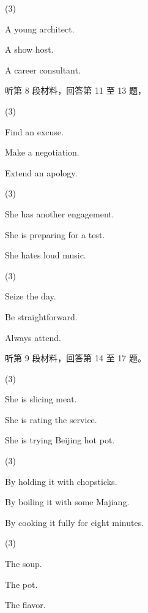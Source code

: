 \documentclass{英语试卷}
\begin{document}
\begin{choices}(3)
  \item A young architect.
  \item A show host.
  \item A career consultant.
\end{choices}
\par 听第 8 段材料，回答第 11 至 13 题，\par
{}
\begin{choices}(3)
  \item Find an excuse.
  \item Make a negotiation.
  \item Extend an apology.
\end{choices}
\begin{choices}(3)
  \item She has another engagement.
  \item She is preparing for a test.
  \item She hates loud music.
\end{choices}
\begin{choices}(3)
  \item Seize the day.
  \item Be straightforward.
  \item Always attend.
\end{choices}
\par 听第 9 段材料，回答第 14 至 17 题。\par
{}
\begin{choices}(3)
  \item She is slicing meat.
  \item She is rating the service.
  \item She is trying Beijing hot pot.
\end{choices}
\begin{choices}(3)
  \item By holding it with chopsticks.
  \item By boiling it with some Majiang.
  \item By cooking it fully for eight minutes.
\end{choices}
\begin{choices}(3)
  \item The soup.
  \item The pot.
  \item The flavor.
\end{choices}
\end{document}
